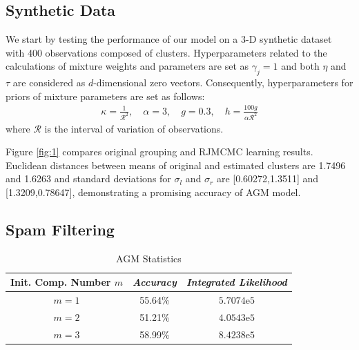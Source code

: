\documentclass[conference]{IEEEtran}
\begin{document}
\subsection{Synthetic Data}

We start by testing the performance of our model on a 3-D synthetic dataset with 400 observations composed of clusters. Hyperparameters related to the calculations of mixture weights and parameters are set as $\gamma_j = 1$ and both $\eta$ and $\tau$ are considered as $d$-dimensional zero vectors. Consequently, hyperparameters for priors of mixture parameters are set as follows\cite{Stephens2000}:
\begin{align}
\kappa = \frac{1}{\mathcal{R}^2}, \quad \alpha = 3, \quad g=0.3, \quad h=\frac{100g}{\alpha\mathcal{R}^2}
\label{eq:hypers}
\end{align}
where $\mathcal{R}$ is the interval of variation of observations.

Figure \ref{fig:1} compares original grouping and RJMCMC learning results. Euclidean distances between means of original and estimated clusters are 1.7496 and 1.6263 and standard deviations for $\sigma_l$ and $\sigma_r$ are [0.60272,1.3511] and [1.3209,0.78647], demonstrating a promising accuracy of AGM model.

\subsection{Spam Filtering}

\begin{table}[b]
\caption{AGM Statistics}
\begin{center}
\begin{tabular}{|c|c|c|}
\hline
\multicolumn{1}{|p{2cm}|}{\centering \textbf{Init. Comp. Number $m$}} & \multicolumn{1}{|p{2cm}|}{\centering \textbf{\textit{Accuracy}}} & \multicolumn{1}{|p{2cm}|}{\centering \textbf{\textit{Integrated Likelihood}}}\\
\hline
$m=1$ & 55.64\% & $5.7074\mathrm{e}{5}$\\
$m=2$ & 51.21\% & $4.0543\mathrm{e}{5}$ \\
$m=3$ & 58.99\% & $8.4238\mathrm{e}{5}$ \\
\hline
\end{tabular}
\label{tab1}
\end{center}
\end{table}
\end{document}
